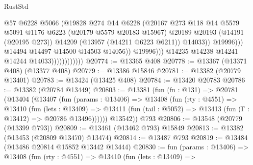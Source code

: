 \begin{lexlean}{RustStd}
\begin{coremodule}
                                            @57
                                            @6228
                                            @5066
                                            (@19828
                                              @274
                                              @14
                                              @6228
                                              (@20167
                                                @273
                                                @118
                                                @14
                                                @5579
                                                @5091
                                                @1176
                                                @6223
                                                (@20179 @5579 @20183 @15967)
                                                @20189
                                                @20193
                                                (@14191 (@20195 @273))
                                                @14209
                                                (@13957 (@14211 @6223 @6211))
                                                @14033))
                                            @19996)))
                                      @14494
                                      @14497
                                      @14500
                                      @14503
                                      @14056))
                                  @19996)))
                            @14235
                            @14238
                            @14241
                            @14244
                            @14033))))))))))))
@20774 := @13365 @408
@20778 := @13367 (@13371 @408) (@13377 @408)
@20779 := @13386 @15846
@20781 := @13382 (@20779 @13401)
@20783 := @13424 (@13425 @408)
@20784 := @13420 @20783
@20786 := @13382 (@20784 @13449)
@20803 := @13381
    (fun (fn : @131) =>
    @20781
      (@13404
        (@13407
          (fun (params : @13406) =>
          @13408
            (fun (rty : @4551) =>
            @13410
              (fun (lets : @13409) =>
              @13411 (fun (tail : @5052) => @13413 (fun (Γ : @13412) => @20786 @13496))))))
        @13542))
    @793
@20806 := @13548 (@20779 (@13399 @793))
@20809 := @13461 (@13462 @793) @15849
@20813 := @13382 (@13453 (@20809 @13470) @13474)
@20814 := @13487 @793
@20819 := @13484 (@13486 @20814 @15852 @13442 @13444)
@20830 := fun (params : @13406) =>
  @13408
    (fun (rty : @4551) =>
    @13410
      (fun (lets : @13409) =>

\end{coremodule}
\end{lexlean}
